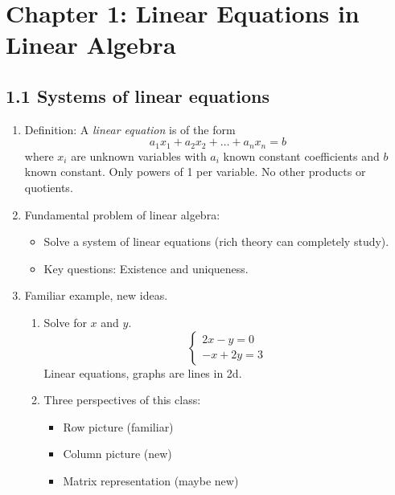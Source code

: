 \documentclass{article}
\begin{document}
\section{Chapter 1: Linear Equations in Linear Algebra} 


\subsection{1.1 Systems of linear equations}

\begin{enumerate}

\item Definition: A \emph{linear equation} is of the form
\[
a_1 x_1 + a_2 x_2 + \dots + a_n x_n = b
\]
where $x_i$ are unknown variables with $a_i$ known constant coefficients and $b$ known constant. Only powers of 1 per variable. No other products or quotients.

\item Fundamental problem of linear algebra:
\begin{itemize}
\item Solve a system of linear equations (rich theory can completely study).
\item Key questions: Existence and uniqueness.
\end{itemize}

\item Familiar example, new ideas.
\begin{enumerate}
\item Solve for $x$ and $y$.
\[
\begin{cases}
2x-y=0 \\
-x+2y=3
\end{cases}
\]
Linear equations, graphs are lines in 2d. 

\item Three perspectives of this class:
\begin{itemize}
\item Row picture (familiar)
\item Column picture (new)
\item Matrix representation (maybe new)
\end{itemize}


\end{enumerate}
\end{enumerate}
\end{document}
